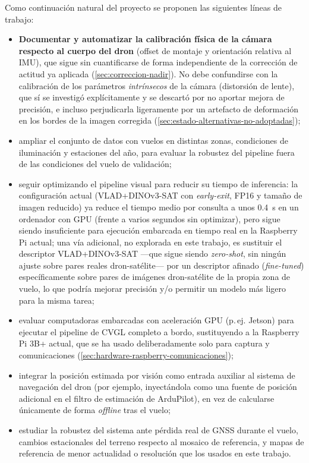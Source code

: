 Como continuación natural del proyecto se proponen las siguientes líneas de trabajo:

\begin{itemize}
\item \textbf{Documentar y automatizar la calibración física de la cámara respecto al cuerpo del dron} (offset de montaje y orientación relativa al IMU), que sigue sin cuantificarse de forma independiente de la corrección de actitud ya aplicada (\autoref{sec:correccion-nadir}). No debe confundirse con la calibración de los parámetros \emph{intrínsecos} de la cámara (distorsión de lente), que sí se investigó explícitamente y se descartó por no aportar mejora de precisión, e incluso perjudicarla ligeramente por un artefacto de deformación en los bordes de la imagen corregida (\autoref{sec:estado-alternativas-no-adoptadas});
\item ampliar el conjunto de datos con vuelos en distintas zonas, condiciones de iluminación y estaciones del año, para evaluar la robustez del pipeline fuera de las condiciones del vuelo de validación;
\item seguir optimizando el pipeline visual para reducir su tiempo de inferencia: la configuración actual (VLAD+DINOv3-SAT con \textit{early-exit}, FP16 y tamaño de imagen reducido) ya reduce el tiempo medio por consulta a unos \SI{0.4}{\second} en un ordenador con GPU (frente a varios segundos sin optimizar), pero sigue siendo insuficiente para ejecución embarcada en tiempo real en la Raspberry Pi actual; una vía adicional, no explorada en este trabajo, es sustituir el descriptor VLAD+DINOv3-SAT —que sigue siendo \textit{zero-shot}, sin ningún ajuste sobre pares reales dron-satélite— por un descriptor afinado (\textit{fine-tuned}) específicamente sobre pares de imágenes dron-satélite de la propia zona de vuelo, lo que podría mejorar precisión y/o permitir un modelo más ligero para la misma tarea;
\item evaluar computadoras embarcadas con aceleración GPU (p.\,ej. Jetson) para ejecutar el pipeline de CVGL completo a bordo, sustituyendo a la Raspberry Pi 3B+ actual, que se ha usado deliberadamente solo para captura y comunicaciones (\autoref{sec:hardware-raspberry-comunicaciones});
\item integrar la posición estimada por visión como entrada auxiliar al sistema de navegación del dron (por ejemplo, inyectándola como una fuente de posición adicional en el filtro de estimación de ArduPilot), en vez de calcularse únicamente de forma \textit{offline} tras el vuelo;
\item estudiar la robustez del sistema ante pérdida real de GNSS durante el vuelo, cambios estacionales del terreno respecto al mosaico de referencia, y mapas de referencia de menor actualidad o resolución que los usados en este trabajo.
\end{itemize}

